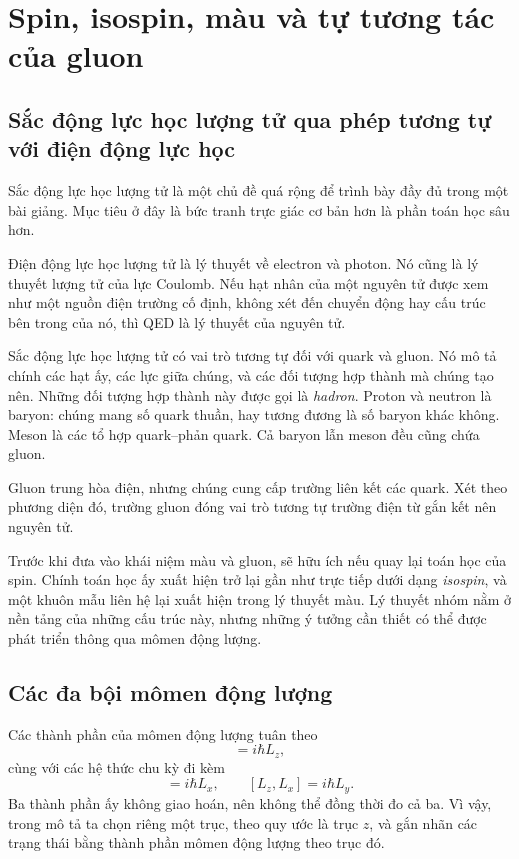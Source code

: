 \chapter{Spin, isospin, màu và tự tương tác của gluon}

\section{Sắc động lực học lượng tử qua phép tương tự với điện động lực học}

Sắc động lực học lượng tử là một chủ đề quá rộng để trình bày đầy đủ trong một bài giảng. Mục tiêu ở đây là bức tranh trực giác cơ bản hơn là phần toán học sâu hơn.

Điện động lực học lượng tử là lý thuyết về electron và photon. Nó cũng là lý thuyết lượng tử của lực Coulomb. Nếu hạt nhân của một nguyên tử được xem như một nguồn điện trường cố định, không xét đến chuyển động hay cấu trúc bên trong của nó, thì QED là lý thuyết của nguyên tử.

Sắc động lực học lượng tử có vai trò tương tự đối với quark và gluon. Nó mô tả chính các hạt ấy, các lực giữa chúng, và các đối tượng hợp thành mà chúng tạo nên. Những đối tượng hợp thành này được gọi là \emph{hadron}. Proton và neutron là baryon: chúng mang số quark thuần, hay tương đương là số baryon khác không. Meson là các tổ hợp quark--phản quark. Cả baryon lẫn meson đều cũng chứa gluon.

Gluon trung hòa điện, nhưng chúng cung cấp trường liên kết các quark. Xét theo phương diện đó, trường gluon đóng vai trò tương tự trường điện từ gắn kết nên nguyên tử.

Trước khi đưa vào khái niệm màu và gluon, sẽ hữu ích nếu quay lại toán học của spin. Chính toán học ấy xuất hiện trở lại gần như trực tiếp dưới dạng \emph{isospin}, và một khuôn mẫu liên hệ lại xuất hiện trong lý thuyết màu. Lý thuyết nhóm nằm ở nền tảng của những cấu trúc này, nhưng những ý tưởng cần thiết có thể được phát triển thông qua mômen động lượng.

\section{Các đa bội mômen động lượng}

Các thành phần của mômen động lượng tuân theo
\begin{equation}
[L_x,L_y]=i\hbar L_z,
\end{equation}
cùng với các hệ thức chu kỳ đi kèm
\begin{equation}
[L_y,L_z]=i\hbar L_x,
\qquad
[L_z,L_x]=i\hbar L_y.
\end{equation}
Ba thành phần ấy không giao hoán, nên không thể đồng thời đo cả ba. Vì vậy, trong mô tả ta chọn riêng một trục, theo quy ước là trục \(z\), và gắn nhãn các trạng thái bằng thành phần mômen động lượng theo trục đó.

